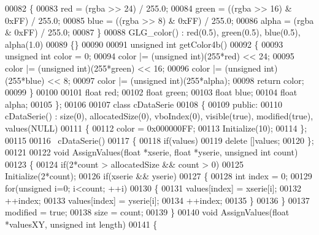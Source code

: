 \begin{DoxyCode}
00082     \{
00083         red = (rgba >> 24)  / 255.0;
00084         green = ((rgba >> 16) & 0xFF) / 255.0;
00085         blue = ((rgba >> 8) & 0xFF) / 255.0;
00086         alpha = (rgba & 0xFF) / 255.0;
00087     \}
00088     GLG_color() : red(0.5), green(0.5), blue(0.5), alpha(1.0)
00089     \{\}
00090 
00091     \textcolor{keywordtype}{unsigned} \textcolor{keywordtype}{int} getColor4b()
00092     \{
00093         \textcolor{keywordtype}{unsigned} \textcolor{keywordtype}{int} color = 0;
00094         color |= (\textcolor{keywordtype}{unsigned} int)(255*red) << 24;
00095         color |= (\textcolor{keywordtype}{unsigned} int)(255*green) << 16;
00096         color |= (\textcolor{keywordtype}{unsigned} int)(255*blue) << 8;
00097         color |= (\textcolor{keywordtype}{unsigned} int)(255*alpha);
00098         \textcolor{keywordflow}{return} color;
00099     \}
00100 
00101     \textcolor{keywordtype}{float} red;
00102     \textcolor{keywordtype}{float} green;
00103     \textcolor{keywordtype}{float} blue;
00104     \textcolor{keywordtype}{float} alpha;
00105 \};
00106 
00107 \textcolor{keyword}{class }cDataSerie
00108 \{
00109 \textcolor{keyword}{public}:
00110     cDataSerie() : size(0), allocatedSize(0), vboIndex(0), visible(true), modified(true), values(NULL)
00111     \{
00112         color = 0x000000FF;
00113         Initialize(10);
00114     \};
00115 
00116     ~cDataSerie()
00117     \{
00118         \textcolor{keywordflow}{if}(values)
00119             \textcolor{keyword}{delete} []values;
00120     \};
00121 
00122     \textcolor{keywordtype}{void} AssignValues(\textcolor{keywordtype}{float} *xserie, \textcolor{keywordtype}{float} *yserie, \textcolor{keywordtype}{unsigned} \textcolor{keywordtype}{int} count)
00123     \{
00124         \textcolor{keywordflow}{if}(2*count > allocatedSize && count > 0)
00125             Initialize(2*count);
00126         \textcolor{keywordflow}{if}(xserie && yserie)
00127         \{
00128             \textcolor{keywordtype}{int} index = 0;
00129             \textcolor{keywordflow}{for}(\textcolor{keywordtype}{unsigned} i=0; i<count; ++i)
00130             \{
00131                 values[index] = xserie[i];
00132                 ++index;
00133                 values[index] = yserie[i];
00134                 ++index;
00135             \}
00136         \}
00137         modified = \textcolor{keyword}{true};
00138         size = count;
00139     \}
00140     \textcolor{keywordtype}{void} AssignValues(\textcolor{keywordtype}{float} *valuesXY, \textcolor{keywordtype}{unsigned} \textcolor{keywordtype}{int} length)
00141     \{

\end{DoxyCode}
